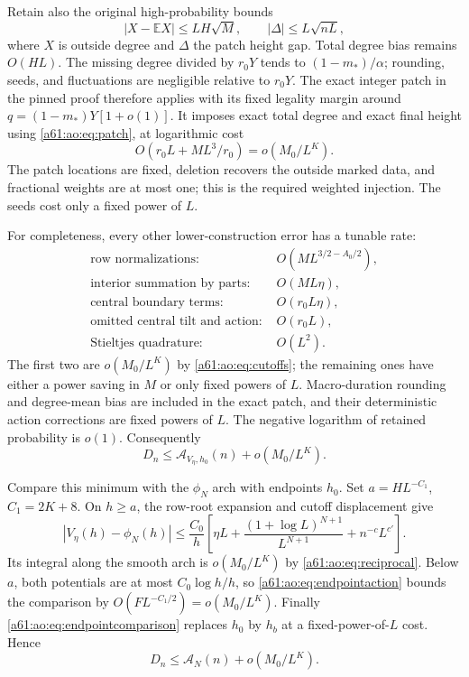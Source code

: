 \documentclass[11pt,letterpaper]{article}
\numberwithin{equation}{section}
\theoremstyle{remark}\newtheorem{remark}[theorem]{Remark}
\newcommand{\A}{\mathcal A}
\begin{document}
Retain also the original high-probability bounds
\[
 |X-\mathbb EX|\le LH\sqrt M,\qquad
 |\Delta|\le L\sqrt{nL},
\]
where $X$ is outside degree and $\Delta$ the patch height gap. Total
degree bias remains $O(HL)$. The missing degree divided by $r_0Y$
tends to $(1-m_*)/\alpha$; rounding, seeds, and fluctuations are
negligible relative to $r_0Y$. The exact integer patch in the pinned
proof therefore applies with its fixed legality margin around
$q=(1-m_*)Y[1+o(1)]$. It imposes exact total degree and exact final
height using \eqref{a61:ao:eq:patch}, at logarithmic cost
\[
 O(r_0L+ML^3/r_0)=o(M_0/L^K).
\]
The patch locations are fixed, deletion recovers the outside marked
data, and fractional weights are at most one; this is the required
weighted injection. The seeds cost only a fixed power of $L$.

For completeness, every other lower-construction error has a tunable
rate:
\begin{align*}
 \text{row normalizations: }&O(ML^{3/2-A_0/2}),\\
 \text{interior summation by parts: }&O(ML\eta),\\
 \text{central boundary terms: }&O(r_0L\eta),\\
 \text{omitted central tilt and action: }&O(r_0L),\\
 \text{Stieltjes quadrature: }&O(L^2).
\end{align*}
The first two are $o(M_0/L^K)$ by \eqref{a61:ao:eq:cutoffs}; the remaining
ones have either a power saving in $M$ or only fixed powers of $L$.
Macro-duration rounding and degree-mean bias are included in the exact
patch, and their deterministic action corrections are fixed powers of
$L$. The negative logarithm of retained probability is $o(1)$.
Consequently
\[
 D_n\le\A_{V_\eta,h_0}(n)+o(M_0/L^K).
\]

Compare this minimum with the $\phi_N$ arch with endpoints $h_0$.
Set $a=HL^{-C_1}$, $C_1=2K+8$. On $h\ge a$, the row-root expansion
and cutoff displacement give
\[
 |V_\eta(h)-\phi_N(h)|\le\frac{C_0}h
 \left[\eta L+\frac{(1+\log L)^{N+1}}{L^{N+1}}
 +n^{-c}L^{c'}\right].
\]
Its integral along the smooth arch is $o(M_0/L^K)$ by
\eqref{a61:ao:eq:reciprocal}. Below $a$, both potentials are at most
$C_0\log h/h$, so \eqref{a61:ao:eq:endpointaction} bounds the comparison by
$O(F L^{-C_1/2})=o(M_0/L^K)$. Finally
\eqref{a61:ao:eq:endpointcomparison} replaces $h_0$ by $h_b$ at a
fixed-power-of-$L$ cost. Hence
\begin{equation}\label{a61:ao:eq:lowercoefficient}
 D_n\le\A_N(n)+o(M_0/L^K).
\end{equation}
\end{document}

